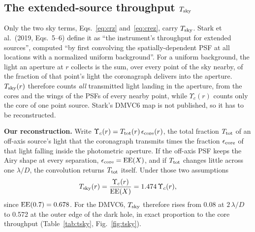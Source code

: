 \documentclass[11pt,a4paper]{article}
\begin{document}
\subsection{The extended-source throughput $T_{\rm sky}$}
\label{sec:tsky}

Only the two sky terms, Eqs.~\eqref{eq:crz} and~\eqref{eq:crez}, carry $T_{\rm sky}$. Stark et
al.\ (2019, Eqs.~5--6) define it as ``the instrument's throughput for extended sources'',
computed ``by first convolving the spatially-dependent PSF at all locations with a normalized
uniform background''. For a uniform background, the light an aperture at $r$ collects is the sum,
over every point of the sky nearby, of the fraction of that point's light the coronagraph
delivers into the aperture. $T_{\rm sky}(r)$ therefore counts \emph{all} transmitted light
landing in the aperture, from the cores and the wings of the PSFs of every nearby point, while
$\Upsilon_c(r)$ counts only the core of one point source. Stark's DMVC6 map is not published, so
it has to be reconstructed.

\textbf{Our reconstruction.} Write $\Upsilon_c(r) = T_{\rm tot}(r)\,\epsilon_{\rm core}(r)$, the
total fraction $T_{\rm tot}$ of an off-axis source's light that the coronagraph transmits times
the fraction $\epsilon_{\rm core}$ of that light falling inside the photometric aperture. If the
off-axis PSF keeps the Airy shape at every separation, $\epsilon_{\rm core} = {\rm EE}(X)$, and if
$T_{\rm tot}$ changes little across one $\lambda/D$, the convolution returns $T_{\rm tot}$ itself.
Under those two assumptions
\begin{equation}
T_{\rm sky}(r) = \frac{\Upsilon_c(r)}{{\rm EE}(X)} = 1.474\,\Upsilon_c(r),
\label{eq:tsky}
\end{equation}
since ${\rm EE}(0.7) = 0.678$. For the DMVC6, $T_{\rm sky}$ therefore rises from 0.08 at
$2\,\lambda/D$ to 0.572 at the outer edge of the dark hole, in exact proportion to the core
throughput (Table~\ref{tab:tsky}, Fig.~\ref{fig:tsky}).
\end{document}

